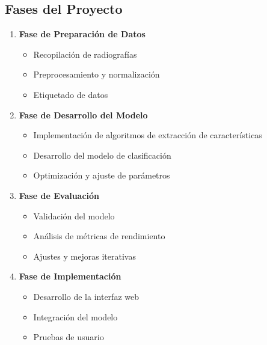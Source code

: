 \documentclass[conference]{IEEEtran}
\begin{document}
\subsection{Fases del Proyecto}
\begin{enumerate}
    \item \textbf{Fase de Preparación de Datos}
    \begin{itemize}
        \item Recopilación de radiografías
        \item Preprocesamiento y normalización
        \item Etiquetado de datos
    \end{itemize}
    
    \item \textbf{Fase de Desarrollo del Modelo}
    \begin{itemize}
        \item Implementación de algoritmos de extracción de características
        \item Desarrollo del modelo de clasificación
        \item Optimización y ajuste de parámetros
    \end{itemize}
    
    \item \textbf{Fase de Evaluación}
    \begin{itemize}
        \item Validación del modelo
        \item Análisis de métricas de rendimiento
        \item Ajustes y mejoras iterativas
    \end{itemize}
    
    \item \textbf{Fase de Implementación}
    \begin{itemize}
        \item Desarrollo de la interfaz web
        \item Integración del modelo
        \item Pruebas de usuario
    \end{itemize}
\end{enumerate}
\end{document}
